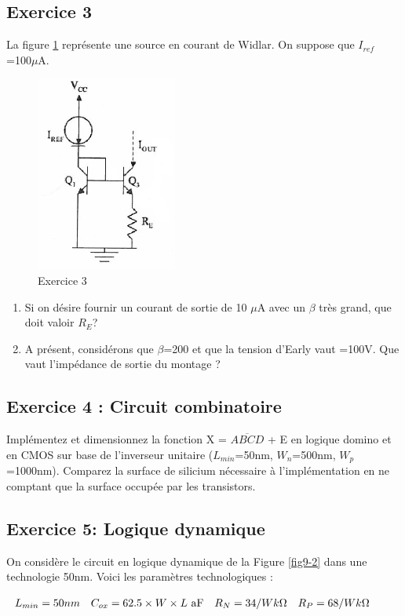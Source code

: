 \documentclass[paper=a4, fontsize=11pt]{article} %
\numberwithin{equation}{section} %
\numberwithin{figure}{section} %
\numberwithin{table}{section} %
\begin{document}
\newpage
\subsection*{Exercice 3}
La figure \ref{fig13-3} représente une source en courant de Widlar. On suppose que $I_{ref}$ =100$\mu$A.

\begin{figure}[!htbp]
   \centering
   \includegraphics[]{figure/fig13-3.png}
   \caption{Exercice 3}
   \label{fig13-3}
\end{figure}

\begin{enumerate}
\item Si on désire fournir un courant de sortie de 10 $\mu$A avec un $\beta$ très grand, que doit valoir $R_E$?
\item A présent, considérons que $\beta$=200 et que la tension d'Early vaut \vea=100V. Que vaut l'impédance de sortie du montage ?
\end{enumerate}


\subsection*{Exercice 4 : Circuit combinatoire}
Implémentez et dimensionnez la fonction X = $\overline{ABCD}$ + E en logique domino et en CMOS sur base de l'inverseur unitaire ($L_{min}$=50nm, $W_n$=500nm, $W_p$=1000nm). Comparez la surface de silicium nécessaire à l'implémentation en ne comptant que la surface occupée par les transistors.

\subsection*{Exercice 5: Logique dynamique}
On considère le circuit en logique dynamique de la Figure \ref{fig9-2} dans une technologie 50nm. Voici les paramètres technologiques :
\begin{center} $ \begin{array}{l l l l} L_{min} = 50nm & C_{ox} = 62.5\times W \times L\text{ aF} & R_N=34/W k \Omega& R_P=68/W k\Omega\\ \end{array}$\end{center}
\end{document}
